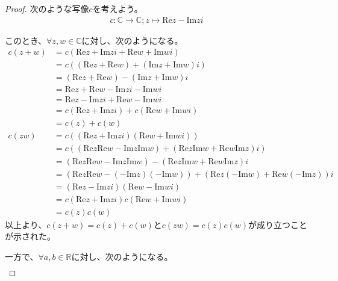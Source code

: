 \documentclass[dvipdfmx]{jsarticle}
\begin{document}
\begin{proof} 次のような写像$c$を考えよう。
\begin{align*}
c:\mathbb{C} \rightarrow \mathbb{C};z \mapsto \mathrm{Re}z - \mathrm{Im}zi
\end{align*}\par
このとき、$\forall z,w \in \mathbb{C}$に対し、次のようになる。
\begin{align*}
c(z + w) &= c\left( \mathrm{Re}z + \mathrm{Im}zi + \mathrm{Re}w + \mathrm{Im}wi \right)\\
&= c\left( \left( \mathrm{Re}z + \mathrm{Re}w \right) + \left( \mathrm{Im}z + \mathrm{Im}w \right)i \right)\\
&= \left( \mathrm{Re}z + \mathrm{Re}w \right) - \left( \mathrm{Im}z + \mathrm{Im}w \right)i\\
&= \mathrm{Re}z + \mathrm{Re}w - \mathrm{Im}zi - \mathrm{Im}wi\\
&= \mathrm{Re}z - \mathrm{Im}zi + \mathrm{Re}w - \mathrm{Im}wi\\
&= c\left( \mathrm{Re}z + \mathrm{Im}zi \right) + c\left( \mathrm{Re}w + \mathrm{Im}wi \right)\\
&= c(z) + c(w)\\
c(zw) &= c\left( \left( \mathrm{Re}z + \mathrm{Im}zi \right)\left( \mathrm{Re}w + \mathrm{Im}wi \right) \right)\\
&= c\left( \left( \mathrm{Re}z\mathrm{Re}w - \mathrm{Im}z\mathrm{Im}w \right) + \left( \mathrm{Re}z\mathrm{Im}w + \mathrm{Re}w\mathrm{Im}z \right)i \right)\\
&= \left( \mathrm{Re}z\mathrm{Re}w - \mathrm{Im}z\mathrm{Im}w \right) - \left( \mathrm{Re}z\mathrm{Im}w + \mathrm{Re}w\mathrm{Im}z \right)i\\
&= \left( \mathrm{Re}z\mathrm{Re}w - \left( - \mathrm{Im}z \right)\left( - \mathrm{Im}w \right) \right) + \left( \mathrm{Re}z\left( - \mathrm{Im}w \right) + \mathrm{Re}w\left( - \mathrm{Im}z \right) \right)i\\
&= \left( \mathrm{Re}z - \mathrm{Im}zi \right)\left( \mathrm{Re}w - \mathrm{Im}wi \right)\\
&= c\left( \mathrm{Re}z + \mathrm{Im}zi \right)c\left( \mathrm{Re}w + \mathrm{Im}wi \right)\\
&= c(z)c(w)
\end{align*}
以上より、$c(z + w) = c(z) + c(w)$と$c(zw) = c(z)c(w)$が成り立つことが示された。\par
一方で、$\forall a,b \in \mathbb{R}$に対し、次のようになる。
\begin{align*}

\end{align*}
\end{proof}
\end{document}
